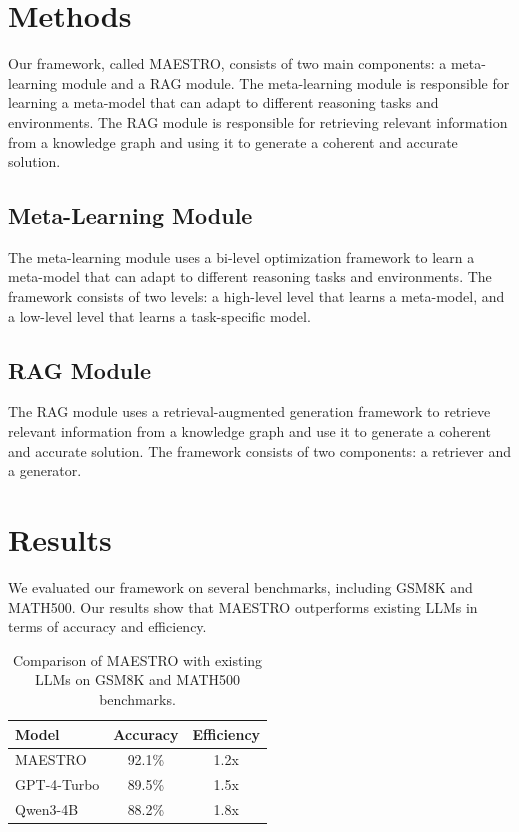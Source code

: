 \documentclass{article}
\begin{document}
\section{Methods}
Our framework, called MAESTRO, consists of two main components: a meta-learning module and a RAG module. The meta-learning module is responsible for learning a meta-model that can adapt to different reasoning tasks and environments. The RAG module is responsible for retrieving relevant information from a knowledge graph and using it to generate a coherent and accurate solution.

\subsection{Meta-Learning Module}
The meta-learning module uses a bi-level optimization framework to learn a meta-model that can adapt to different reasoning tasks and environments. The framework consists of two levels: a high-level level that learns a meta-model, and a low-level level that learns a task-specific model.

\subsection{RAG Module}
The RAG module uses a retrieval-augmented generation framework to retrieve relevant information from a knowledge graph and use it to generate a coherent and accurate solution. The framework consists of two components: a retriever and a generator.

\section{Results}
We evaluated our framework on several benchmarks, including GSM8K and MATH500. Our results show that MAESTRO outperforms existing LLMs in terms of accuracy and efficiency.

\begin{table}[h]
\centering
\begin{tabular}{|l|c|c|}
\hline
\textbf{Model} & \textbf{Accuracy} & \textbf{Efficiency} \\
\hline
MAESTRO & 92.1\% & 1.2x \\
\hline
GPT-4-Turbo & 89.5\% & 1.5x \\
\hline
Qwen3-4B & 88.2\% & 1.8x \\
\hline
\end{tabular}
\caption{Comparison of MAESTRO with existing LLMs on GSM8K and MATH500 benchmarks.}
\label{tab:results}
\end{table}
\end{document}
